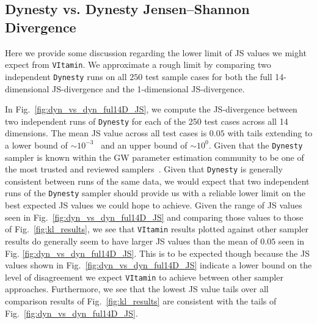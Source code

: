 \subsection{Dynesty vs. Dynesty Jensen--Shannon Divergence}\label{dyn_v_dyn_JS}

Here we provide some discussion regarding the lower limit of \ac{JS} values 
we might expect from \texttt{VItamin}. We approximate a rough 
limit by comparing two 
independent \texttt{Dynesty} runs on all $250$ test sample cases 
for both the full 14-dimensional \ac{JS}-divergence and the 1-dimensional 
\ac{JS}-divergence.

%
%
In Fig.~\ref{fig:dyn_vs_dyn_ful14D_JS}, we compute the \ac{JS}-divergence 
between two independent runs of \texttt{Dynesty} for 
each of the 250 test cases across all 14 dimensions. The mean 
\ac{JS} value across all test cases is $0.05$ with tails extending to a 
lower bound of $\sim 10^{-3}$~ and 
an upper bound of $\sim 10^0$. Given that the \texttt{Dynesty} sampler 
is known within the \ac{GW} parameter estimation community to be one of the most
trusted and reviewed samplers~\cite{2010.14527}. Given that \texttt{Dynesty} 
is generally consistent between runs of the same data, we would expect 
that two independent runs of the \texttt{Dynesty} sampler should 
provide us with a reliable lower limit on the best expected 
\ac{JS} values we could hope to achieve. Given the range of 
\ac{JS} values seen in Fig.~\ref{fig:dyn_vs_dyn_ful14D_JS} and 
comparing those values to those of Fig.~\ref{fig:kl_results}, we see 
that \texttt{VItamin} results plotted against other sampler results do 
generally seem to have larger \ac{JS} values than the mean of 
$0.05$ seen in Fig. \ref{fig:dyn_vs_dyn_ful14D_JS}. This is to be 
expected though because the \ac{JS} values shown 
in  Fig.~\ref{fig:dyn_vs_dyn_ful14D_JS} 
indicate a lower bound on the level of disagreement we 
expect \texttt{VItamin} to achieve between other 
sampler approaches. Furthermore, we see that the lowest \ac{JS} value tails
over all comparison results of 
Fig.~\ref{fig:kl_results} are consistent with the tails 
of Fig.~\ref{fig:dyn_vs_dyn_ful14D_JS}. 
~

